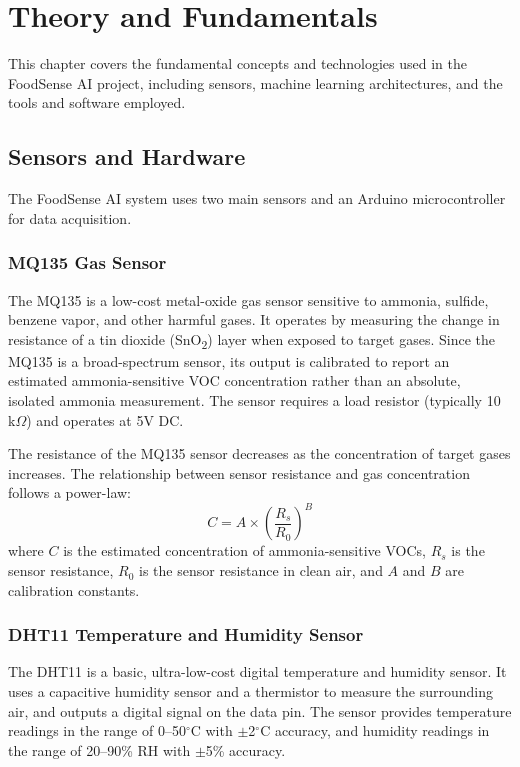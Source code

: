 \chapter{Theory and Fundamentals}
This chapter covers the fundamental concepts and technologies used in the FoodSense AI project, including sensors, machine learning architectures, and the tools and software employed.

\section{Sensors and Hardware}
The FoodSense AI system uses two main sensors and an Arduino microcontroller for data acquisition.

\subsection{MQ135 Gas Sensor}
The MQ135 is a low-cost metal-oxide gas sensor sensitive to ammonia, sulfide, benzene vapor, and other harmful gases. It operates by measuring the change in resistance of a tin dioxide (SnO\textsubscript{2}) layer when exposed to target gases. Since the MQ135 is a broad-spectrum sensor, its output is calibrated to report an estimated ammonia-sensitive VOC concentration rather than an absolute, isolated ammonia measurement. The sensor requires a load resistor (typically 10 k$\Omega$) and operates at 5V DC.

The resistance of the MQ135 sensor decreases as the concentration of target gases increases. The relationship between sensor resistance and gas concentration follows a power-law:
\[
C = A \times \left( \frac{R_s}{R_0} \right)^B
\]
where \(C\) is the estimated concentration of ammonia-sensitive VOCs, \(R_s\) is the sensor resistance, \(R_0\) is the sensor resistance in clean air, and \(A\) and \(B\) are calibration constants.

\subsection{DHT11 Temperature and Humidity Sensor}
The DHT11 is a basic, ultra-low-cost digital temperature and humidity sensor. It uses a capacitive humidity sensor and a thermistor to measure the surrounding air, and outputs a digital signal on the data pin. The sensor provides temperature readings in the range of 0--50$^\circ$C with $\pm$2$^\circ$C accuracy, and humidity readings in the range of 20--90\% RH with $\pm$5\% accuracy.

